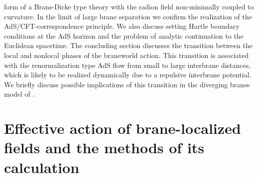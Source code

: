 \documentclass[a4paper,preprint,nofootinbib,
                 showpacs,preprintnumbers,amsmath,amssymb]{revtex4}
\begin{document}
form of a Brans-Dicke type theory with the radion field 
non-minimally coupled to curvature. In the limit of large brane 
separation we confirm the realization of the 
AdS/CFT-correspondence principle. We also discuss setting Hartle 
boundary conditions at the AdS horizon and the problem of analytic 
continuation to the Euclidean spacetime. The concluding section 
discusses the transition between the local and 
nonlocal phases of the braneworld action. This transition is  
associated with the renormalization type AdS flow from small to  
large interbrane distances, which is likely to be realized  
dynamically due to a repulsive interbrane potential. We briefly  
discuss possible implications of this transition in the diverging  
branes model of \cite{brane}. 
 
 
\section{Effective action of brane-localized fields and the  
methods of its calculation\label{struc}} 
 
\end{document}
